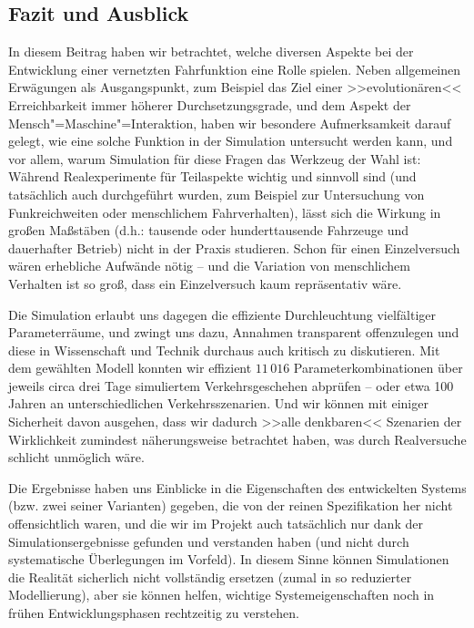 \subsection{Fazit und Ausblick}\label{sec:conclusion}


In diesem Beitrag haben wir betrachtet, welche diversen Aspekte bei der Entwicklung einer vernetzten Fahrfunktion eine Rolle spielen. Neben allgemeinen Erwägungen als Ausgangspunkt, zum Beispiel das Ziel einer >>evolutionären<< Erreichbarkeit immer höherer Durchsetzungsgrade, und dem Aspekt der Mensch"=Maschine"=Interaktion, haben wir besondere Aufmerksamkeit darauf gelegt, wie eine solche Funktion in der Simulation untersucht werden kann, und vor allem, warum Simulation für diese Fragen das Werkzeug der Wahl ist: Während Realexperimente für Teilaspekte wichtig und sinnvoll sind (und tatsächlich auch durchgeführt wurden, zum Beispiel zur Untersuchung von Funkreichweiten oder menschlichem Fahrverhalten), lässt sich die Wirkung in großen Maßstäben (d.h.: tausende oder hunderttausende Fahrzeuge und dauerhafter Betrieb) nicht in der Praxis studieren. Schon für einen Einzelversuch wären erhebliche Aufwände nötig -- und die Variation von menschlichem Verhalten ist so groß, dass ein Einzelversuch kaum repräsentativ wäre.



Die Simulation erlaubt uns dagegen die effiziente Durchleuchtung vielfältiger Parameterräume, und zwingt uns dazu, Annahmen transparent offenzulegen und diese in Wissenschaft und Technik durchaus auch kritisch zu diskutieren. Mit dem gewählten Modell konnten wir effizient $11\,016$ Parameterkombinationen über jeweils circa drei Tage simuliertem Verkehrsgeschehen abprüfen -- oder etwa 100 Jahren an unterschiedlichen Verkehrsszenarien. Und wir können mit einiger Sicherheit davon ausgehen, dass wir dadurch >>alle denkbaren<< Szenarien der Wirklichkeit zumindest näherungsweise betrachtet haben, was durch Realversuche schlicht unmöglich wäre.

Die Ergebnisse haben uns Einblicke in die Eigenschaften des entwickelten Systems (bzw. zwei seiner Varianten) gegeben, die von der reinen Spezifikation her nicht offensichtlich waren, und die wir im Projekt auch tatsächlich nur dank der Simulationsergebnisse gefunden und verstanden haben (und nicht durch systematische Überlegungen im Vorfeld). In diesem Sinne können Simulationen die Realität sicherlich nicht vollständig ersetzen (zumal in so reduzierter Modellierung), aber sie können helfen, wichtige Systemeigenschaften noch in frühen Entwicklungsphasen rechtzeitig zu verstehen.

